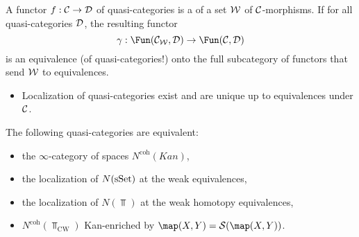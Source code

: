 {A functor $f:\mathcal{C}\to\mathcal{D}$ of quasi-categories is a  of a set $\mathcal{W}$ of $\mathcal{C}$-morphisms. If for all quasi-categories $\mathcal{D}$, the resulting functor
\[\gamma:\Fun(\Cc_\Ww,\Dd)\to\Fun(\Cc,\Dd)\]
is an equivalence (of quasi-categories!) onto the full subcategory of functors that send $\mathcal{W}$ to equivalences. 

\begin{itemize}
    \item Localization of quasi-categories exist and are unique up to equivalences under $\mathcal{C}$.
\end{itemize}

\begin{theorem}
The following quasi-categories are equivalent:
\begin{itemize}[label={-}]
    \item the $\infty$-category of spaces $N^\text{coh}(Kan)$,
    \item the localization of $N({\mathrm{sSet}})$ at the weak equivalences,
    \item the localization of $N(\Top)$ at the weak homotopy equivalences,
    \item $N^\text{coh}(\Top_\text{CW})$ Kan-enriched by $\map(X,Y)=\S(\map(X,Y))$.
\end{itemize}
\end{theorem}
}
